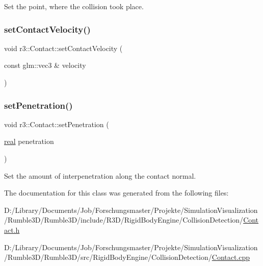 Set the point, where the collision took place. \mbox{\label{classr3_1_1_contact_a7ccc2c56a4dcc5b16967f9832fea87ab}} 
\subsubsection{\texorpdfstring{set\+Contact\+Velocity()}{setContactVelocity()}}
{\footnotesize\ttfamily void r3\+::\+Contact\+::set\+Contact\+Velocity (\begin{DoxyParamCaption}\item[{const glm\+::vec3 \&}]{velocity }\end{DoxyParamCaption})}

\mbox{\label{classr3_1_1_contact_a828feb22ff02fe787739eb5d87cfec38}} 
\subsubsection{\texorpdfstring{set\+Penetration()}{setPenetration()}}
{\footnotesize\ttfamily void r3\+::\+Contact\+::set\+Penetration (\begin{DoxyParamCaption}\item[{\mbox{\hyperlink{namespacer3_ab2016b3e3f743fb735afce242f0dc1eb}{real}}}]{penetration }\end{DoxyParamCaption})}

Set the amount of interpenetration along the contact normal. 

The documentation for this class was generated from the following files\+:\begin{DoxyCompactItemize}
\item 
D\+:/\+Library/\+Documents/\+Job/\+Forschungsmaster/\+Projekte/\+Simulation\+Visualization/\+Rumble3\+D/\+Rumble3\+D/include/\+R3\+D/\+Rigid\+Body\+Engine/\+Collision\+Detection/\mbox{\hyperlink{_contact_8h}{Contact.\+h}}\item 
D\+:/\+Library/\+Documents/\+Job/\+Forschungsmaster/\+Projekte/\+Simulation\+Visualization/\+Rumble3\+D/\+Rumble3\+D/src/\+Rigid\+Body\+Engine/\+Collision\+Detection/\mbox{\hyperlink{_contact_8cpp}{Contact.\+cpp}}\end{DoxyCompactItemize}
